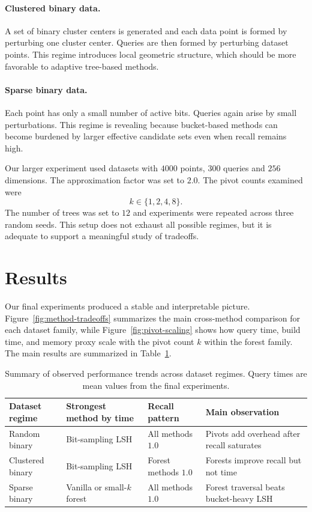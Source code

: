 \documentclass[11pt]{article}
\begin{document}
\paragraph{Clustered binary data.} A set of binary cluster centers is generated and each data point is formed by perturbing one cluster center. Queries are then formed by perturbing dataset points. This regime introduces local geometric structure, which should be more favorable to adaptive tree-based methods.

\paragraph{Sparse binary data.} Each point has only a small number of active bits. Queries again arise by small perturbations. This regime is revealing because bucket-based methods can become burdened by larger effective candidate sets even when recall remains high.

Our larger experiment used datasets with $4000$ points, $300$ queries and $256$ dimensions. The approximation factor was set to $2.0$. The pivot counts examined were
\[
    k \in \{1,2,4,8\}.
\]
The number of trees was set to $12$ and experiments were repeated across three random seeds. This setup does not exhaust all possible regimes, but it is adequate to support a meaningful study of tradeoffs.

\section{Results}

Our final experiments produced a stable and interpretable picture. Figure~\ref{fig:method-tradeoffs} summarizes the main cross-method comparison for each dataset family, while Figure~\ref{fig:pivot-scaling} shows how query time, build time, and memory proxy scale with the pivot count $k$ within the forest family. The main results are summarized in Table~\ref{tab:summary}.

\begin{table}[h]
\centering
\caption{Summary of observed performance trends across dataset regimes. Query times are mean values from the final experiments.}
\label{tab:summary}
\begin{tabular}{@{}p{}p{}p{}p{}@{}}
\toprule
Dataset regime & Strongest method by time & Recall pattern & Main observation \\
\midrule
Random binary & Bit-sampling LSH & All methods $1.0$ & Pivots add overhead after recall saturates \\
Clustered binary & Bit-sampling LSH & Forest methods $1.0$ & Forests improve recall but not time \\
Sparse binary & Vanilla or small-$k$ forest & All methods $1.0$ & Forest traversal beats bucket-heavy LSH \\
\bottomrule
\end{tabular}
\end{table}
\end{document}
